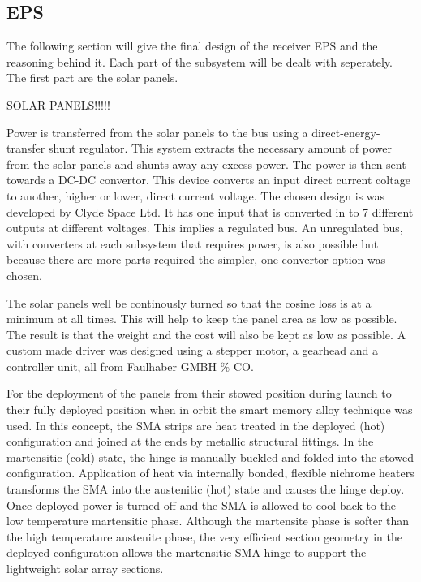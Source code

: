 \subsection{\acl{EPS}}
\label{receiver_EPS}

The following section will give the final design of the receiver \ac{EPS} and the reasoning behind it.
Each part of the subsystem will be dealt with seperately. The first part are the solar panels.

SOLAR PANELS!!!!!

Power is transferred from the solar panels to the bus using a direct-energy-transfer shunt regulator. This system extracts the necessary amount of power from the solar panels and shunts away any excess power. The power is then sent towards a DC-DC convertor. This device converts an input direct current coltage to another, higher or lower, direct current voltage. The chosen design is was developed by Clyde Space Ltd. It has one input that is converted in to 7 different outputs at different voltages. This implies a regulated bus. An unregulated bus, with converters at each subsystem that requires power, is also possible but because there are more parts required the simpler, one convertor option was chosen.

The solar panels well be continously turned so that the cosine loss is at a minimum at all times. This will help to keep the panel area as low as possible. The result is that the weight and the cost will also be kept as low as possible. A custom made driver was designed using a stepper motor, a gearhead and a controller unit, all from Faulhaber GMBH $\%$ CO. 

For the deployment of the panels from their stowed position during launch to their fully deployed position when in orbit the smart memory alloy technique was used. In this concept, the SMA strips are heat treated in the deployed (hot) configuration and joined at the ends by metallic structural fittings. In the martensitic (cold) state, the hinge is manually buckled and folded into the stowed configuration. Application of heat via internally bonded, flexible nichrome heaters transforms the SMA into the austenitic (hot) state and causes the hinge deploy. Once deployed power is turned off and the SMA is allowed to cool back to the low temperature martensitic phase. Although the martensite phase is softer than the high temperature austenite phase, the very efficient section geometry in the deployed configuration allows the martensitic SMA hinge to support the lightweight solar array sections.

